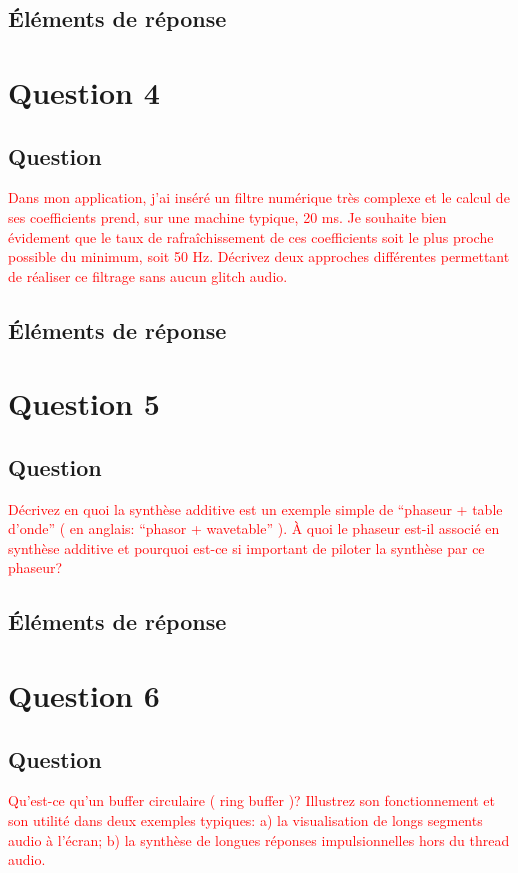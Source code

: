 \documentclass[letterpaper, 12pt]{article}
\newcommand{\alinea}{
\hspace*{0.5cm}}
\newcommand{\red}[1]{
	\textcolor{red}{#1}}
\begin{document}
		\subsection{\'Eléments de réponse}
			\alinea %
	\section{Question 4}
		\subsection{Question}
			\alinea \red{Dans mon application, j’ai inséré un filtre numérique très complexe et le calcul de ses coefficients prend, sur 
				une machine typique, 20 ms. Je souhaite bien évidement que le taux de rafraîchissement de ces coefficients soit le 
				plus proche possible du minimum, soit 50 Hz. Décrivez deux approches différentes permettant de réaliser ce filtrage 
				sans aucun glitch audio.}
		\subsection{\'Eléments de réponse}
			\alinea %
	\section{Question 5}
		\subsection{Question}
			\alinea \red{Décrivez en quoi la synthèse additive est un exemple simple de “phaseur + table d’onde” 
				( en anglais: “phasor + wavetable” ). À quoi le phaseur est-il associé en synthèse additive et pourquoi est-ce si 
				important de piloter la synthèse par ce phaseur?}
		\subsection{\'Eléments de réponse}
			\alinea %
	\section{Question 6}
		\subsection{Question}
			\alinea \red{Qu’est-ce qu’un buffer circulaire ( ring buffer )? Illustrez son fonctionnement et son utilité dans deux exemples
				typiques: a) la visualisation de longs segments audio à l’écran; b) la synthèse de longues réponses impulsionnelles 
				hors du thread audio.}
\end{document}
